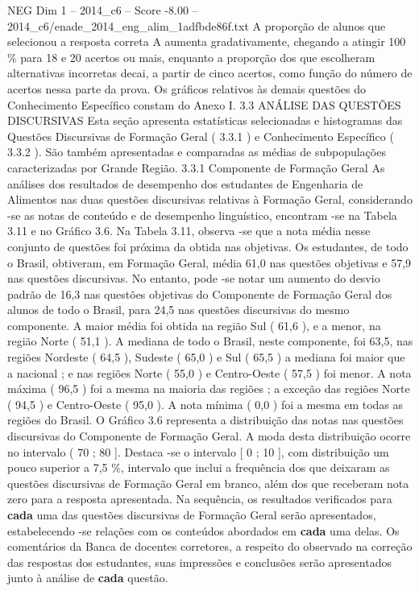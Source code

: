 \begin{textsample}{NEG Dim 1 – 2014\_c6 – Score -8.00 – 2014\_c6/enade\_2014\_eng\_alim\_1adfbde86f.txt}
A proporção de alunos que selecionou a resposta correta A aumenta gradativamente, chegando a atingir 100 \% para 18 e 20 acertos ou mais, enquanto a proporção dos que escolheram alternativas incorretas decai, a partir de cinco acertos, como função do número de acertos nessa parte da prova.
Os gráficos relativos às demais questões do Conhecimento Específico constam do Anexo I. 3.3 ANÁLISE DAS QUESTÕES DISCURSIVAS Esta seção apresenta estatísticas selecionadas e histogramas das Questões Discursivas de Formação Geral ( 3.3.1 ) e Conhecimento Específico ( 3.3.2 ).
São também apresentadas e comparadas as médias de subpopulações caracterizadas por Grande Região. 3.3.1 Componente de Formação Geral As análises dos resultados de desempenho dos estudantes de Engenharia de Alimentos nas duas questões discursivas relativas à Formação Geral, considerando -se as notas de conteúdo e de desempenho linguístico, encontram -se na Tabela 3.11 e no Gráfico 3.6.
Na Tabela 3.11, observa -se que a nota média nesse conjunto de questões foi próxima da obtida nas objetivas.
Os estudantes, de todo o Brasil, obtiveram, em Formação Geral, média 61,0 nas questões objetivas e 57,9 nas questões discursivas.
No entanto, pode -se notar um aumento do desvio padrão de 16,3 nas questões objetivas do Componente de Formação Geral dos alunos de todo o Brasil, para 24,5 nas questões discursivas do mesmo componente.
A maior média foi obtida na região Sul ( 61,6 ), e a menor, na região Norte ( 51,1 ).
A mediana de todo o Brasil, neste componente, foi 63,5, nas regiões Nordeste ( 64,5 ), Sudeste ( 65,0 ) e Sul ( 65,5 ) a mediana foi maior que a nacional ; e nas regiões Norte ( 55,0 ) e Centro-Oeste ( 57,5 ) foi menor.
A nota máxima ( 96,5 ) foi a mesma na maioria das regiões ; a exceção das regiões Norte ( 94,5 ) e Centro-Oeste ( 95,0 ).
A nota mínima ( 0,0 ) foi a mesma em todas as regiões do Brasil.
O Gráfico 3.6 representa a distribuição das notas nas questões discursivas do Componente de Formação Geral.
A moda desta distribuição ocorre no intervalo ( 70 ; 80 ].
Destaca -se o intervalo [ 0 ; 10 ], com distribuição um pouco superior a 7,5 \%, intervalo que inclui a frequência dos que deixaram as questões discursivas de Formação Geral em branco, além dos que receberam nota zero para a resposta apresentada.
Na sequência, os resultados verificados para \textbf{cada} uma das questões discursivas de Formação Geral serão apresentados, estabelecendo -se relações com os conteúdos abordados em \textbf{cada} uma delas.
Os comentários da Banca de docentes corretores, a respeito do observado na correção das respostas dos estudantes, suas impressões e conclusões serão apresentados junto à análise de \textbf{cada} questão.

\end{textsample}
